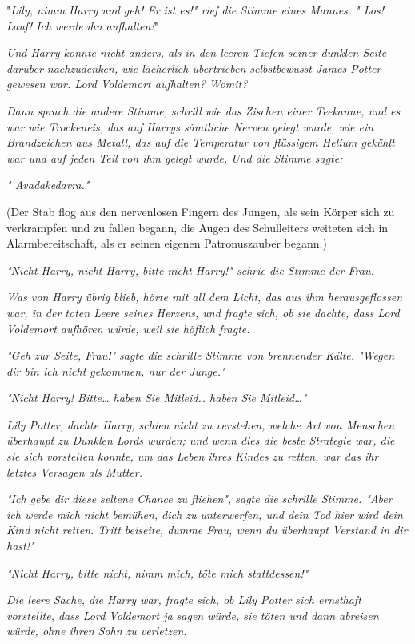 {"\emph{Lily, nimm Harry und geh! Er ist es!" rief die Stimme eines Mannes. " Los! Lauf! Ich werde} \emph{ihn aufhalten!}"

\emph{Und Harry konnte nicht anders, als in den leeren Tiefen seiner dunklen Seite darüber nachzudenken, wie lächerlich übertrieben selbstbewusst James Potter gewesen war. Lord Voldemort aufhalten? Womit?}

\emph{\emph{Dann sprach die andere Stimme, schrill wie das Zischen einer Teekanne, und es war wie Trockeneis, das auf Harrys sämtliche Nerven gelegt wurde, wie ein} \emph{Brandzeichen} \emph{aus Metall, das auf} \emph{die Temperatur von} \emph{flüssigem} \emph{Helium gekühlt} \emph{war} \emph{und auf jeden Teil von ihm gelegt wurde. Und die Stimme sagte:}}

\emph{" Avadakedavra."}

(Der Stab flog aus den nervenlosen Fingern des Jungen, als sein Körper sich zu verkrampfen und zu fallen begann, die Augen des Schulleiters weiteten sich in Alarmbereitschaft, als er seinen eigenen Patronuszauber begann.)

\emph{"Nicht Harry, nicht Harry, bitte nicht Harry!" schrie die Stimme der Frau.}

\emph{Was von Harry übrig blieb, hörte mit all dem Licht, das aus ihm herausgeflossen war, in der toten Leere seines Herzens, und fragte sich, ob sie dachte, dass Lord Voldemort aufhören würde, weil sie höflich fragte.}

\emph{"Geh zur Seite, Frau!" sagte die schrille Stimme von brennender Kälte. "Wegen dir bin ich nicht gekommen, nur der Junge."}

\emph{"Nicht Harry! Bitte… haben Sie Mitleid… haben Sie Mitleid…"}

\emph{Lily Potter, dachte Harry, schien nicht zu verstehen, welche Art von Menschen überhaupt zu Dunklen Lords wurden; und wenn dies die beste Strategie war, die sie sich vorstellen konnte, um das Leben ihres Kindes zu retten, war das ihr letztes Versagen als Mutter.}

\emph{"Ich gebe dir diese seltene Chance zu fliehen", sagte die schrille Stimme. "Aber ich werde mich nicht bemühen, dich zu unterwerfen, und dein Tod hier wird dein Kind nicht retten. Tritt beiseite, dumme Frau, wenn du überhaupt Verstand in dir hast!"}

\emph{"Nicht Harry, bitte nicht, nimm mich, töte mich stattdessen!"}

\emph{Die leere Sache, die Harry war, fragte sich, ob Lily Potter sich ernsthaft vorstellte, dass Lord Voldemort ja sagen würde, sie töten und dann abreisen würde, ohne ihren Sohn zu verletzen.}

}

